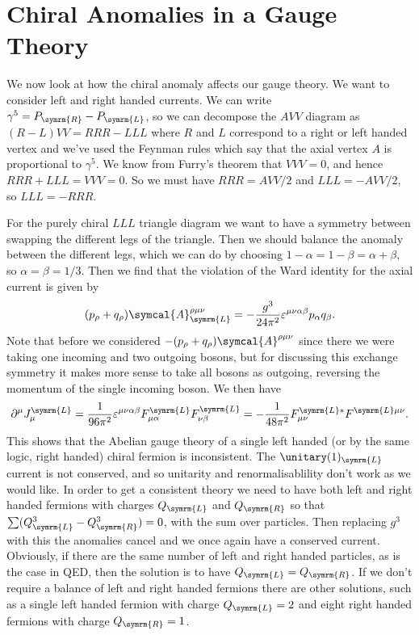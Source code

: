 \documentclass[fleqn]{NotesClass}
\newcommand{\amplitude}{\symcal{A}}
\newcommand{\Left}{\symrm{L}}
\newcommand{\Right}{\symrm{R}}
\begin{document}
    \section{Chiral Anomalies in a Gauge Theory}
    We now look at how the chiral anomaly affects our gauge theory.
    We want to consider left and right handed currents.
    We can write \(\gamma^5 = P_{\Right} - P_{\Left}\), so we can decompose the \(AVV\) diagram as \((R - L)VV = RRR - LLL\) where \(R\) and \(L\) correspond to a right or left handed vertex and we've used the Feynman rules which say that the axial vertex \(A\) is proportional to \(\gamma^5\).
    We know from Furry's theorem that \(VVV = 0\), and hence \(RRR + LLL = VVV = 0\).
    So we must have \(RRR = AVV/2\) and \(LLL = -AVV/2\), so \(LLL = -RRR\).
    
    For the purely chiral \(LLL\) triangle diagram we want to have a symmetry between swapping the different legs of the triangle.
    Then we should balance the anomaly between the different legs, which we can do by choosing \(1 - \alpha = 1 - \beta = \alpha + \beta\), so \(\alpha = \beta = 1/3\).
    Then we find that the violation of the Ward identity for the axial current is given by
    \begin{equation}
        (p_\rho + q_\rho) \amplitude^{\rho\mu\nu}_{\Left} = -\frac{g^3}{24\pi^2} \varepsilon^{\mu\nu\alpha\beta}p_\alpha q_\beta.
    \end{equation}
    Note that before we considered \(-(p_\rho + q_\rho) \amplitude^{\rho\mu\nu}\) since there we were taking one incoming and two outgoing bosons, but for discussing this exchange symmetry it makes more sense to take all bosons as outgoing, reversing the momentum of the single incoming boson.
    We then have
    \begin{equation}
        \partial^\mu J^{\Left}_\mu = \frac{1}{96\pi^2} \varepsilon^{\mu\nu\alpha\beta} F^{\Left}_{\mu\alpha} F^{\Left}_{\nu\beta} = -\frac{1}{48\pi^2}F^{\Left*}_{\mu\nu}F^{\Left \mu\nu}.
    \end{equation}
    This shows that the Abelian gauge theory of a single left handed (or by the same logic, right handed) chiral fermion is inconsistent.
    The \(\unitary(1)_{\Left}\) current is not conserved, and so unitarity and renormalisablility don't work as we would like.
    In order to get a consistent theory we need to have both left and right handed fermions with charges \(Q_{\Left}\) and \(Q_{\Right}\) so that \(\sum(Q_{\Left}^3 - Q_{\Right}^3) = 0\), with the sum over particles.
    Then replacing \(g^3\) with this the anomalies cancel and we once again have a conserved current.
    Obviously, if there are the same number of left and right handed particles, as is the case in QED, then the solution is to have \(Q_{\Left} = Q_{\Right}\).
    If we don't require a balance of left and right handed fermions there are other solutions, such as a single left handed fermion with charge \(Q_{\Left} = 2\) and eight right handed fermions with charge \(Q_{\Right} = 1\).
    
\end{document}
